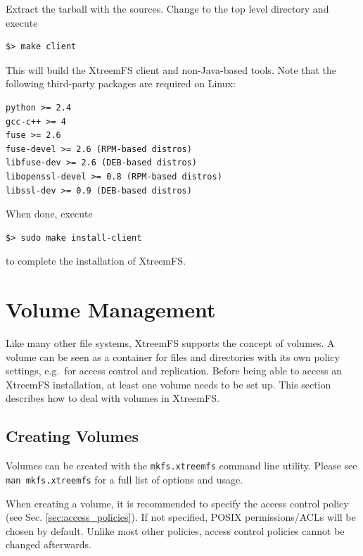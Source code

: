 \documentclass[a4paper,10pt]{book}
\begin{document}
Extract the tarball with the sources. Change to the top level directory and execute

\begin{verbatim}
$> make client
\end{verbatim}

This will build the XtreemFS client and non-Java-based tools. Note that the following third-party packages are required on Linux:

\begin{verbatim}
python >= 2.4
gcc-c++ >= 4
fuse >= 2.6
fuse-devel >= 2.6 (RPM-based distros)
libfuse-dev >= 2.6 (DEB-based distros)
libopenssl-devel >= 0.8 (RPM-based distros)
libssl-dev >= 0.9 (DEB-based distros)
\end{verbatim}

When done, execute

\begin{verbatim}
$> sudo make install-client
\end{verbatim}

to complete the installation of XtreemFS.


\section{Volume Management}

Like many other file systems, XtreemFS supports the concept of volumes. A volume can be seen as a container for files and directories with its own policy settings, e.g.\ for access control and replication. Before being able to access an XtreemFS installation, at least one volume needs to be set up. This section describes how to deal with volumes in XtreemFS.

\subsection{Creating Volumes}
\label{sec:create_volume}

Volumes can be created with the \texttt{mkfs.xtreemfs} command line utility. Please see \texttt{man mkfs.xtreemfs} for a full list of options and usage.

When creating a volume, it is recommended to specify the access control policy (see Sec. \ref{sec:access_policies}). If not specified, POSIX permissions/ACLs will be chosen by default. Unlike most other policies, access control policies cannot be changed afterwards.
\end{document}
